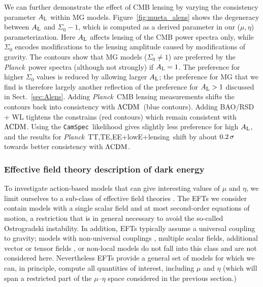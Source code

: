 \documentclass[longauth,traditabstract]{aa}
\def\Planck{\textit{Planck}}
\def\,{\thinspace}
\newcommand{\camspec}{{\tt CamSpec}}
\newcommand{\mksym}[1]{\ifmmode {\rm #1}\else #1\fi}
\newcommand{\dataplus}{\allowbreak+}
\newcommand{\lensing}{\mksym{lensing}}
\newcommand{\TTTEEE}{\mksym{TT,TE,EE}}
\newcommand{\planckTTTEEEonly}{\planck\ \TTTEEE}
\newcommand{\lowE}{\mksym{lowE}}
\newcommand{\planckall}{\planckTTTEEEonly\dataplus\lowE}
\newcommand{\planckalllensing}{\planckall\dataplus\lensing}
\newcommand{\lcdm}{\texorpdfstring{{$\rm{\Lambda CDM}$}}{ΛCDM}}
\newcommand{\Alens}{A_{\rm L}}
\newcommand{\planck}{\Planck}
\begin{document}
We can further demonstrate the effect of CMB lensing by varying the consistency parameter $\Alens$ within MG models.
Figure~\ref{fig:mueta_alens} shows the degeneracy between $\Alens$ and $\Sigma_0-1$, which is computed as
a derived parameter in our ($\mu,\eta$) parameterization. Here $\Alens$ affects lensing of the CMB power spectra
only, while $\Sigma_0$ encodes modifications to the lensing
amplitude caused by modifications of gravity. The contours show that
 MG models ($\Sigma_0 \ne 1$) are preferred by the \Planck\ power spectra (although not strongly) if $\Alens = 1$.
The preference for higher $\Sigma_0$ values is reduced by allowing
larger $\Alens$; the preference for MG that we find is therefore largely another
reflection of the preference for $\Alens > 1$ discussed in Sect.~\ref{sec:Alens}. Adding \Planck\
CMB lensing measurements shifts the contours back into consistency
with \lcdm\ (blue contours). Adding BAO/RSD + WL tightens the constrains (red contours)
which remain consistent with \lcdm.
Using the \camspec\ likelihood gives slightly less preference for high $\Alens$, and the results for \planckalllensing\ shift by about $0.2\,\sigma$ towards better consistency with \lcdm.




\subsubsection{Effective field theory description of dark energy\label{sec:eft}}

To investigate action-based models that can give interesting values of
$\mu$ and $\eta$, we limit ourselves to a sub-class of effective field
theories
\citep[EFTs,][]{2008JHEP...03..014C,Creminelli:2008wc,Gubitosi:2012hu}. The
EFTs we consider contain models with a single scalar field and at most
second-order equations of motion, a restriction that is in general
necessary to avoid the so-called Ostrogradski instability. In addition,
EFTs typically assume a universal coupling to gravity; models with
non-universal couplings \citep{Amendola:1999er, Pettorino:2008ez},
multiple scalar fields, additional vector \citep{Hellings:1973zz} or
tensor fields \citep{Hassan:2011tf}, or non-local
models \citep{Belgacem:2017cqo} do not fall into this class and are
not considered here. Nevertheless EFTs provide a general set of models
for which we can, in principle, compute all quantities of interest,
including $\mu$ and $\eta$ (which will span a restricted part of the
 $\mu$--$\eta$ space considered in the previous section.)
\end{document}
